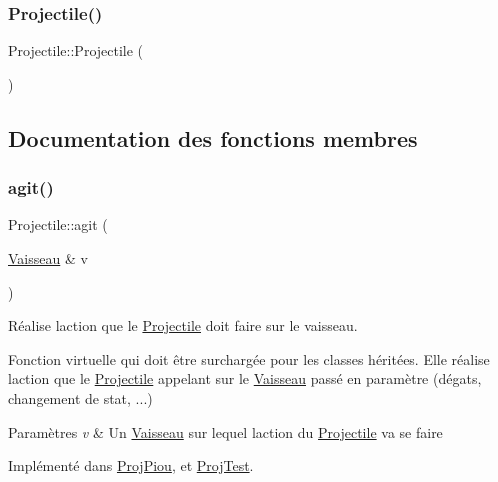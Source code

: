 \subsubsection{\texorpdfstring{Projectile()}{Projectile()}}
{\footnotesize\ttfamily Projectile\+::\+Projectile (\begin{DoxyParamCaption}{ }\end{DoxyParamCaption})}



\subsection{Documentation des fonctions membres}
\mbox{\label{class_projectile_a8550c8b1b012c5c290fb6da5b06f57ef}} 
\subsubsection{\texorpdfstring{agit()}{agit()}}
{\footnotesize\ttfamily Projectile\+::agit (\begin{DoxyParamCaption}\item[{\hyperlink{class_vaisseau}{Vaisseau} \&}]{v }\end{DoxyParamCaption})\hspace{0.3cm}{\ttfamily [pure virtual]}}



Réalise l\textquotesingle{}action que le {\ttfamily \hyperlink{class_projectile}{Projectile}} doit faire sur le vaisseau. 

Fonction virtuelle qui doit être surchargée pour les classes héritées. Elle réalise l\textquotesingle{}action que le {\ttfamily \hyperlink{class_projectile}{Projectile}} appelant sur le {\ttfamily \hyperlink{class_vaisseau}{Vaisseau}} passé en paramètre (dégats, changement de stat, ...) 
\begin{DoxyParams}{Paramètres}
{\em v} & Un {\ttfamily \hyperlink{class_vaisseau}{Vaisseau}} sur lequel l\textquotesingle{}action du {\ttfamily \hyperlink{class_projectile}{Projectile}} va se faire \\
\hline
\end{DoxyParams}


Implémenté dans \hyperlink{class_proj_piou_a1594d1ba2fd53ff82af597d2505a7db2}{Proj\+Piou}, et \hyperlink{class_proj_test_a3adb674973dcd21c6ddaee809b719a65}{Proj\+Test}.

